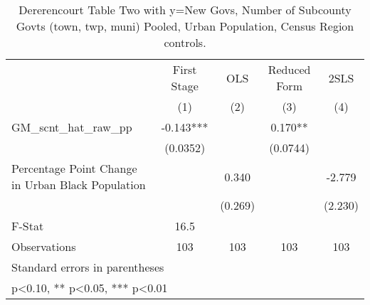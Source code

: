 \begin{table}[htbp]\centering
\def\sym#1{\ifmmode^{#1}\else\(^{#1}\)\fi}
\caption{Dererencourt Table Two with y=New Govs, Number of Subcounty Govts (town, twp, muni)  Pooled, Urban Population, Census Region controls.}
\begin{tabular}{l*{4}{c}}
\toprule
                    & First Stage   &         OLS   &Reduced Form   &        2SLS   \\
                    &\multicolumn{1}{c}{(1)}   &\multicolumn{1}{c}{(2)}   &\multicolumn{1}{c}{(3)}   &\multicolumn{1}{c}{(4)}   \\
\midrule
GM\_scnt\_hat\_raw\_pp  &      -0.143***&               &       0.170** &               \\
                    &    (0.0352)   &               &    (0.0744)   &               \\
\addlinespace
Percentage Point Change in Urban Black Population&               &       0.340   &               &      -2.779   \\
                    &               &     (0.269)   &               &     (2.230)   \\
\midrule
F-Stat              &        16.5   &               &               &               \\
Observations        &         103   &         103   &         103   &         103   \\
\bottomrule
\multicolumn{5}{l}{\footnotesize Standard errors in parentheses}\\
\multicolumn{5}{l}{\footnotesize * p<0.10, ** p<0.05, *** p<0.01}\\
\end{tabular}
\end{table}

